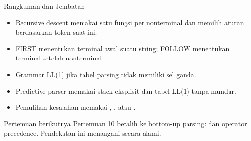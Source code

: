 \documentclass[aspectratio=169,10pt,t]{beamer}
\begin{document}
\begin{frame}{Rangkuman dan Jembatan}
  \begin{itemize}
    \item Recursive descent memakai satu fungsi per nonterminal dan
          memilih aturan berdasarkan token saat ini.
    \item FIRST menentukan terminal awal suatu string; FOLLOW
          menentukan terminal setelah nonterminal.
    \item Grammar LL(1) jika tabel parsing tidak memiliki sel ganda.
    \item Predictive parser memakai stack eksplisit dan tabel LL(1)
          tanpa mundur.
    \item Pemulihan kesalahan memakai ,
          , atau .
  \end{itemize}

  \vspace{4pt}
  \begin{exampleblock}{Pertemuan berikutnya}
    Pertemuan 10 beralih ke bottom-up parsing:  dan
    operator precedence. Pendekatan ini menangani 
    secara alami.
  \end{exampleblock}
\end{frame}
\end{document}
